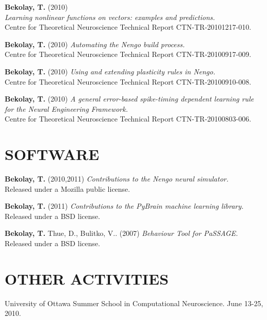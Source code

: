 \documentclass[line,margin]{res}
\begin{document}
\begin{resume}
  \textbf{Bekolay, T.} (2010) \\
    {\sl Learning nonlinear functions on vectors: examples and predictions.} \\
      Centre for Theoretical Neuroscience Technical Report CTN-TR-20101217-010.

  \textbf{Bekolay, T.} (2010)
    {\sl Automating the Nengo build process.} \\
    Centre for Theoretical Neuroscience Technical Report CTN-TR-20100917-009.

  \textbf{Bekolay, T.} (2010)
    {\sl Using and extending plasticity rules in Nengo.} \\
    Centre for Theoretical Neuroscience Technical Report CTN-TR-20100910-008.

  \textbf{Bekolay, T.} (2010)
    {\sl A general error-based spike-timing dependent learning rule for the Neural Engineering Framework.} \\
    Centre for Theoretical Neuroscience Technical Report CTN-TR-20100803-006.

\section{SOFTWARE}
  \textbf{Bekolay, T.} (2010,2011)
    {\sl Contributions to the Nengo neural simulator.} \\
    Released under a Mozilla public license.

  \textbf{Bekolay, T.} (2011)
    {\sl Contributions to the PyBrain machine learning library.} \\
    Released under a BSD license.

  \textbf{Bekolay, T.} Thue, D., Bulitko, V.. (2007)
    {\sl Behaviour Tool for PaSSAGE.} \\
    Released under a BSD license.

\section{OTHER ACTIVITIES}
  University of Ottawa Summer School in Computational Neuroscience.
  June 13-25, 2010.

\end{resume}
\end{document}
